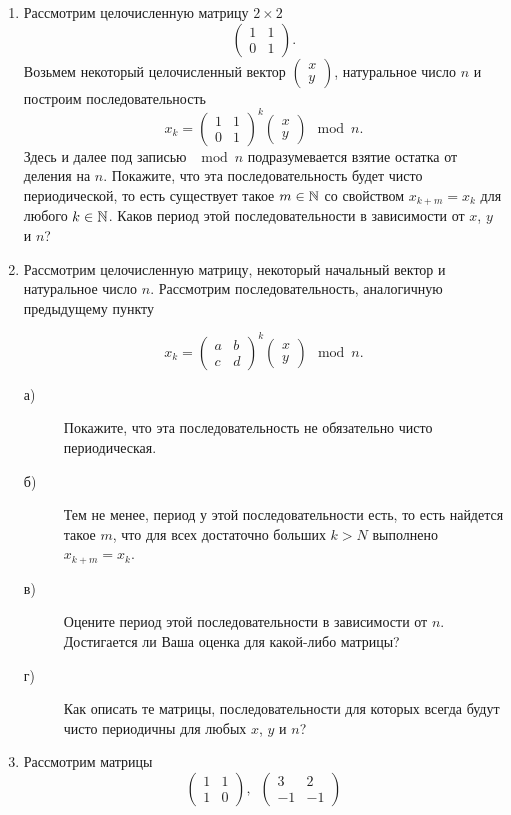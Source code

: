 \begin{enumerate}
\item Рассмотрим целочисленную матрицу $2\times 2$ 
$$\left(\begin{matrix}
1 & 1 \\
0 & 1 
\end{matrix}\right).$$
Возьмем некоторый целочисленный вектор $\left(\begin{smallmatrix} x  \\ y \end{smallmatrix}\right)$, натуральное число $n$ и построим последовательность
$$x_k=\left(\begin{matrix}
1 & 1 \\
0 & 1 
\end{matrix}\right)^k \left(\begin{matrix} x \\ y \end{matrix}\right) \mod n.$$
Здесь и далее под записью $\mod n$ подразумевается взятие остатка от деления на $n$.
Покажите, что эта последовательность будет чисто периодической, то есть существует такое $m\in \mathbb{N}$ со свойством $x_{k+m}=x_k$ для любого $k\in\mathbb{N}$. Каков период этой последовательности в зависимости от $x$, $y$ и $n$?
\item Рассмотрим целочисленную матрицу, некоторый начальный вектор и натуральное число $n$. Рассмотрим последовательность, аналогичную предыдущему пункту

$$x_k=\left(\begin{matrix}
a & b \\
c & d
\end{matrix}\right)^k\left(\begin{matrix} x \\ y \end{matrix}\right) \mod n.$$
\begin{description}
\item[а)] Покажите, что эта последовательность не обязательно чисто периодическая.
\item[б)] Тем не менее, период у этой последовательности есть, то есть найдется такое $m$, что для всех достаточно больших $k>N$ выполнено $x_{k+m}=x_k$. 
\item[в)] Оцените период этой последовательности в зависимости от $n$. Достигается ли Ваша оценка для какой-либо матрицы?
\item[г)] Как описать те матрицы, последовательности для которых всегда будут чисто периодичны для любых $x$, $y$ и $n$?
\end{description}
\item Рассмотрим матрицы 
$$\left(\begin{matrix}
1 & 1 \\
1 & 0
\end{matrix}\right), \,\,\,\left(\begin{matrix}
3 & 2 \\
-1 & -1
\end{matrix}\right)
$$


\end{enumerate}
